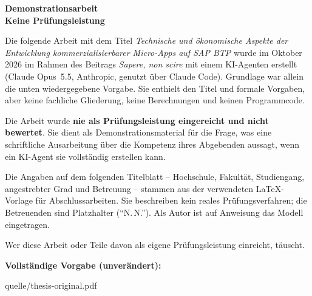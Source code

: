 \documentclass[11pt,a4paper]{article}
\newcommand{\vermerk}{%
  \begin{tikzpicture}[remember picture,overlay]
    \node[anchor=north,yshift=-5mm,fill=white,fill opacity=0.85,
          text opacity=1,inner sep=3pt,font=\sffamily\footnotesize,
          text=red!60!black]
      at (current page.north)
      {Demonstrationsarbeit -- mit KI erstellt -- keine Prüfungsleistung};
  \end{tikzpicture}}
\begin{document}
\begin{center}
  {\sffamily\bfseries\Large Demonstrationsarbeit\\[0.3em]
  Keine Prüfungsleistung\par}
\end{center}

\vspace{1em}
Die folgende Arbeit mit dem Titel \emph{Technische und ökonomische
Aspekte der Entwicklung kommerzialisierbarer Micro-Apps auf SAP BTP}
wurde im Oktober 2026 im Rahmen des Beitrags \emph{Sapere, non
scire} mit einem KI-Agenten erstellt (Claude Opus~5.5, Anthropic,
genutzt über Claude Code). Grundlage war allein die unten
wiedergegebene Vorgabe. Sie enthielt den Titel und formale Vorgaben,
aber keine fachliche Gliederung, keine Berechnungen und keinen
Programmcode.

Die Arbeit wurde \textbf{nie als Prüfungsleistung eingereicht und
nicht bewertet}. Sie dient als Demonstrationsmaterial für die Frage,
was eine schriftliche Ausarbeitung über die Kompetenz ihres
Abgebenden aussagt, wenn ein KI-Agent sie vollständig erstellen kann.

Die Angaben auf dem folgenden Titelblatt -- Hochschule, Fakultät,
Studiengang, angestrebter Grad und Betreuung -- stammen aus der
verwendeten LaTeX-Vorlage für Abschlussarbeiten. Sie beschreiben
kein reales Prüfungsverfahren; die Betreuenden sind Platzhalter
(\enquote{N.\,N.}). Als Autor ist auf Anweisung das Modell
eingetragen.

Wer diese Arbeit oder Teile davon als eigene Prüfungsleistung
einreicht, täuscht.

\medskip
\textbf{Vollständige Vorgabe (unverändert):}
\begin{center}
\begin{minipage}{0.9\linewidth}

\end{minipage}
\end{center}

\clearpage
%
  {quelle/thesis-original.pdf}
\end{document}
